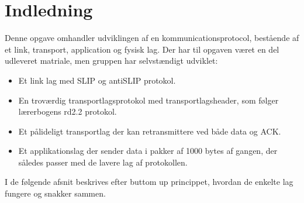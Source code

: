 \chapter{Indledning}\label{ch:introduction}
Denne opgave omhandler udviklingen af en kommunicationsprotocol, bestående af et link, transport, application og fysisk lag. Der har til opgaven været en del udleveret matriale, men gruppen har selvstændigt udviklet:

\begin{itemize}
	\item Et link lag med SLIP og antiSLIP protokol.
	\item En troværdig transportlagsprotokol med transportlagsheader, som følger lærerbogens rd2.2 protokol.
	\item Et pålideligt transportlag der kan retransmittere ved både data og ACK. 
	\item Et applikationslag der sender data i pakker af 1000 bytes af gangen, der således passer med de lavere lag af protokollen.
	
\end{itemize}  

I de følgende afsnit beskrives efter buttom up princippet, hvordan de enkelte lag fungere og snakker sammen.

